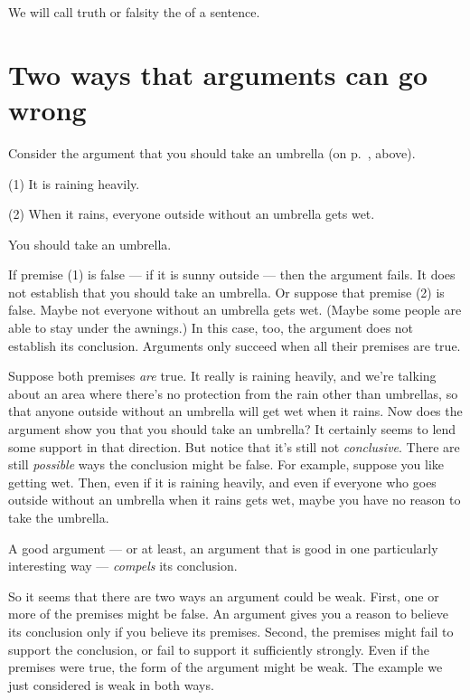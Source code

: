 We will call truth or falsity the  of a sentence.



\section{Two ways that arguments can go wrong}
Consider the argument that you should take an umbrella (on p.~\pageref{argRaining}, above).

\begin{earg}
\item[(1)] It is raining heavily.
\item[(2)] When it rains, everyone outside without an umbrella gets wet.
\item[\therefore] You should take an umbrella.
\end{earg}

If premise (1) is false --- if it is sunny outside --- then the argument fails. It does not establish that you should take an umbrella. Or suppose that premise (2) is false. Maybe not everyone without an umbrella gets wet. (Maybe some people are able to stay under the awnings.) In this case, too, the argument does not establish its conclusion. Arguments only succeed when all their premises are true.

Suppose both premises \emph{are} true. It really is raining heavily, and we're talking about an area where there's no protection from the rain other than umbrellas, so that anyone outside without an umbrella will get wet when it rains. Now does the argument show you that you should take an umbrella? It certainly seems to lend some support in that direction. But notice that it's still not \emph{conclusive}. There are still \emph{possible} ways the conclusion might be false. For example, suppose you like getting wet. Then, even if it is raining heavily, and even if everyone who goes outside without an umbrella when it rains gets wet, maybe you have no reason to take the umbrella.

A good argument --- or at least, an argument that is good in one particularly interesting way --- \emph{compels} its conclusion.

So it seems that there are two ways an argument could be weak. First, one or more of the premises might be false. An argument gives you a reason to believe its conclusion only if you believe its premises. Second, the premises might fail to support the conclusion, or fail to support it sufficiently strongly. Even if the premises were true, the form of the argument might be weak. The example we just considered is weak in both ways.

